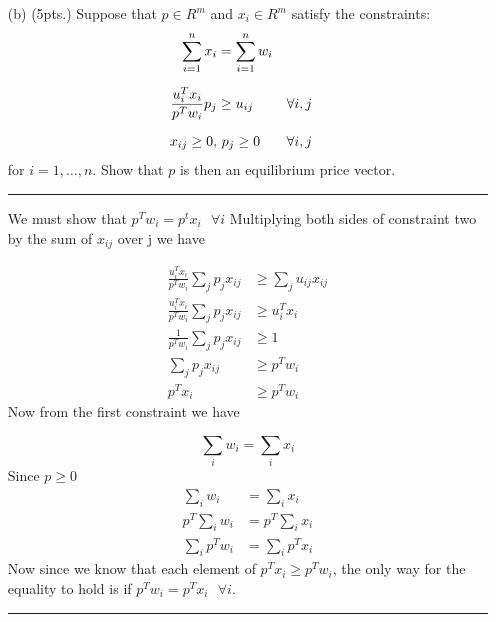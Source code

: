 \documentclass{article} %
\begin{document}
\begin{enumerate}
\begin{itemize}
\rule{\textwidth}{1pt}


\item[(b)] (5pts.) Suppose that $p\in R^m$ and $x_i\in R^m$ satisfy the constraints:
\begin{align*}
\sum_{i=1}^n x_{i} &= \sum_{i=1}^nw_{i} \\
\noalign{\medskip}
\frac{u_i^Tx_i}{p^Tw_i}p_j &\geq u_{ij} && \forall i,j\\
\noalign{\medskip} x_{ij}\geq 0, &\ p_j\ge 0 && \forall i,j
\end{align*}
for $i=1,\ldots,n$.  Show that $p$ is then an equilibrium price vector.

\rule{\textwidth}{1pt}

We must show that $p^T w_i = p^t x_i \mbox{  } \forall i$
Multiplying both sides of constraint two by the sum of $x_{ij}$ over j we have

\begin{equation*}
\begin{aligned}
\frac{u_i^T x_i}{p^T w_i} \sum_{j} p_j x_{ij} &\geq \sum_{j} u_{ij} x_{ij} \\ 
\frac{u_i^T x_i}{p^T w_i} \sum_{j} p_j x_{ij} &\geq u_i^T x_i  \\ 
\frac{1}{p^T w_i} \sum_{j} p_j x_{ij} &\geq 1 \\ 
\sum_{j} p_j x_{ij} &\geq p^T w_i \\
p^T x_i &\geq p^T w_i
\end{aligned}
\end{equation*}
Now from the first constraint we have

\[
\sum_i w_i = \sum_i x_i
\]
Since $p \geq 0$
\begin{equation*}
\begin{aligned}
\sum_i w_i &= \sum_i x_i \\ 
p^T \sum_i w_i  &= p^T \sum_i x_i \\ 
\sum_i p^T w_i  &= \sum_i p^T  x_i
\end{aligned}
\end{equation*}
Now since we know that each element of $p^T x_i \geq p^T w_i$, the only way for the 
equality to hold is if $p^Tw_i = p^T x_i \mbox{  } \forall i$. 



\rule{\textwidth}{1pt}




\end{itemize}
\end{enumerate}
\end{document}
